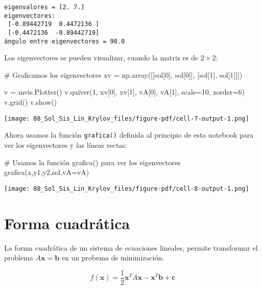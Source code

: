\documentclass[
  letterpaper,
  DIV=11,
  numbers=noendperiod]{scrreprt}
\newenvironment{Shaded}{\begin{snugshade}}{\end{snugshade}}
\newcommand{\CommentTok}[1]{\textcolor[rgb]{0.37,0.37,0.37}{#1}}
\newcommand{\DecValTok}[1]{\textcolor[rgb]{0.68,0.00,0.00}{#1}}
\newcommand{\NormalTok}[1]{\textcolor[rgb]{0.00,0.23,0.31}{#1}}
\newcommand{\OperatorTok}[1]{\textcolor[rgb]{0.37,0.37,0.37}{#1}}
\begin{document}
\begin{verbatim}
eigenvalores = [2. 7.]
eigenvectores:
 [-0.89442719  0.4472136 ] 
 [-0.4472136  -0.89442719]
ángulo entre eigenvectores = 90.0
\end{verbatim}

Los eigenvectores se pueden visualizar, cuando la matriz es de
\(2\times2\):

\begin{Shaded}
\begin{Highlighting}[]
\CommentTok{\# Graficamos los eigenvectores}
\NormalTok{xv }\OperatorTok{=}\NormalTok{ np.array([[sol[}\DecValTok{0}\NormalTok{], sol[}\DecValTok{0}\NormalTok{]],}
\NormalTok{               [sol[}\DecValTok{1}\NormalTok{], sol[}\DecValTok{1}\NormalTok{]]])}

\NormalTok{v }\OperatorTok{=}\NormalTok{ mvis.Plotter() }
\NormalTok{v.quiver(}\DecValTok{1}\NormalTok{, xv[}\DecValTok{0}\NormalTok{], xv[}\DecValTok{1}\NormalTok{], vA[}\DecValTok{0}\NormalTok{], vA[}\DecValTok{1}\NormalTok{], scale}\OperatorTok{=}\DecValTok{10}\NormalTok{, zorder}\OperatorTok{=}\DecValTok{6}\NormalTok{)}
\NormalTok{v.grid()}
\NormalTok{v.show()}
\end{Highlighting}
\end{Shaded}

\texttt{[image: 08\_Sol\_Sis\_Lin\_Krylov\_files/figure-pdf/cell-7-output-1.png]}

Ahora usamos la función \texttt{grafica()} definida al principio de esta
notebook para ver los eigenvectores y las líneas rectas:

\begin{Shaded}
\begin{Highlighting}[]
\CommentTok{\# Usamos la función grafica() para ver los eigenvectores}
\NormalTok{grafica(x,y1,y2,sol,vA}\OperatorTok{=}\NormalTok{vA)}
\end{Highlighting}
\end{Shaded}

\texttt{[image: 08\_Sol\_Sis\_Lin\_Krylov\_files/figure-pdf/cell-8-output-1.png]}

\section{Forma cuadrática}\label{forma-cuadruxe1tica}

La forma cuadrática de un sistema de ecuaciones lineales, permite
transformar el problema \(A \mathbf{x} = \mathbf{b}\) en un probema de
minimización.

\[ f(\mathbf{x}) = \dfrac{1}{2} \mathbf{x}^T A \mathbf{x} - \mathbf{x}^T \mathbf{b} + \mathbf{c} \]
\end{document}
